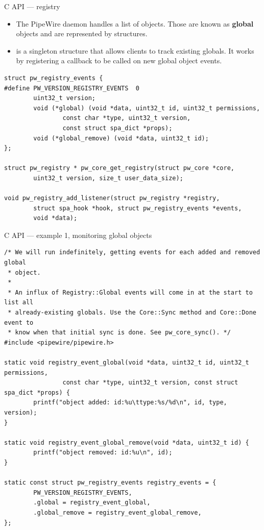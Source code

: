 \begin{frame}[fragile]{C API — registry}
  \begin{itemize}

  \item The PipeWire daemon handles a list of objects. Those are
    known as \textbf{global} objects and are represented by
     structures.

  \item {} is a singleton structure that allows clients
    to track existing globals. It works by registering a callback to be
    called on new global object events.

  \end{itemize}

      \begin{block}{}
        \fontsize{9}{9}\selectfont
          \begin{verbatim}
struct pw_registry_events {
#define PW_VERSION_REGISTRY_EVENTS  0
        uint32_t version;
        void (*global) (void *data, uint32_t id, uint32_t permissions,
                const char *type, uint32_t version,
                const struct spa_dict *props);
        void (*global_remove) (void *data, uint32_t id);
};

struct pw_registry * pw_core_get_registry(struct pw_core *core,
        uint32_t version, size_t user_data_size);

void pw_registry_add_listener(struct pw_registry *registry,
        struct spa_hook *hook, struct pw_registry_events *events,
        void *data);
          \end{verbatim}
      \end{block}
\end{frame}



\begin{frame}[fragile]{C API — example 1, monitoring global objects}
  \begin{block}{}
    \fontsize{8}{8}\selectfont
      \begin{verbatim}
/* We will run indefinitely, getting events for each added and removed global
 * object.
 *
 * An influx of Registry::Global events will come in at the start to list all
 * already-existing globals. Use the Core::Sync method and Core::Done event to
 * know when that initial sync is done. See pw_core_sync(). */
#include <pipewire/pipewire.h>

static void registry_event_global(void *data, uint32_t id, uint32_t permissions,
                const char *type, uint32_t version, const struct spa_dict *props) {
        printf("object added: id:%u\ttype:%s/%d\n", id, type, version);
}

static void registry_event_global_remove(void *data, uint32_t id) {
        printf("object removed: id:%u\n", id);
}

static const struct pw_registry_events registry_events = {
        PW_VERSION_REGISTRY_EVENTS,
        .global = registry_event_global,
        .global_remove = registry_event_global_remove,
};
    \end{verbatim}
  \end{block}
\end{frame}



